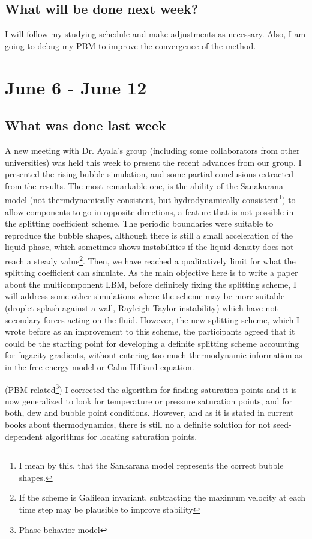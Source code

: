 \documentclass[12pt]{article}
\begin{document}
	\subsection*{What will be done next week?}
	I will follow my studying schedule and make adjustments as necessary. Also, I am going to debug my PBM to improve the convergence of the method. 
	
	\pagebreak
	\section*{June 6 - June 12}
	\subsection*{What was done last week}
	A new meeting with Dr. Ayala's group (including some collaborators from other universities) was held this week to present the recent advances from our group. I presented the rising bubble simulation, and some partial conclusions extracted from the results. The most remarkable one, is the ability of the Sanakarana model (not thermdynamically-consistent, but hydrodynamically-consistent\footnote{I mean by this, that the Sankarana model represents the correct bubble shapes.}) to allow components to go in opposite directions, a feature that is not possible in the splitting coefficient scheme. The periodic boundaries were suitable to reproduce the bubble shapes, although there is still a small acceleration of the liquid phase, which sometimes shows instabilities if the liquid density does not reach a steady value\footnote{If the scheme is Galilean invariant, subtracting the maximum velocity at each time step may be plausible to improve stability}. Then, we have reached a qualitatively limit for what the splitting coefficient can simulate. As the main objective here is to write a paper about the multicomponent LBM, before definitely fixing the splitting scheme, I will address some other simulations where the scheme may be more suitable (droplet splash against a wall, Rayleigh-Taylor instability) which have not secondary forces acting on the fluid. However, the new splitting scheme, which I wrote before as an improvement to this scheme, the participants agreed that it could be the starting point for developing a definite splitting scheme accounting for fugacity gradients, without entering too much thermodynamic information as in the free-energy model or Cahn-Hilliard equation.
	
	(PBM related\footnote{Phase behavior model}) I corrected the algorithm for finding saturation points and it is now generalized to look for temperature or pressure saturation points, and for both, dew and bubble point conditions. However, and as it is stated in current books about thermodynamics, there is still no a definite solution for not seed-dependent algorithms for locating saturation points. 
		
\end{document}
